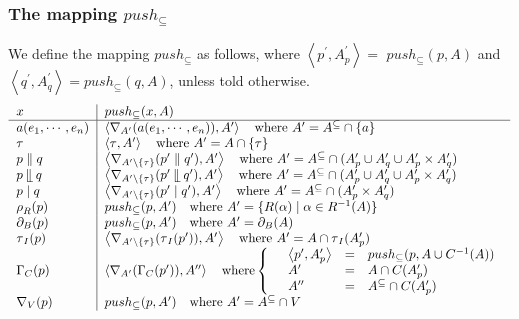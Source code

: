 \documentclass{article}
\begin{document}
\newpage

\subsubsection{The mapping $push_{\subseteq }$}

We define the mapping $push_{\subseteq }$ as follows, where $\left\langle
p^{\prime },A_{p}^{\prime }\right\rangle =$ $push_{\subseteq }(p,A)$ and $%
\left\langle q^{\prime },A_{q}^{\prime }\right\rangle =push_{\subseteq
}(q,A) $, unless told otherwise.%
\[
\begin{tabular}{l|l}
$x$ & $push_{\subseteq }(x,A)$ \\ \hline
$a(e_{1},\cdots ,e_{n})$ & $\left\langle \nabla _{A^{\prime
}}(a(e_{1},\cdots ,e_{n})),A^{\prime }\right\rangle \text{ where }A^{\prime
}=A^{\subseteq }\cap \{a\}$ \\ 
$\tau $ & $\left\langle \tau ,A^{\prime }\right\rangle \text{ where }%
A^{\prime }=A\cap \{\tau \}$ \\ 
$p\parallel q$ & $\left\langle \nabla _{A^{\prime }\setminus \{\tau
\}}(p^{\prime }\parallel q^{\prime }),A^{\prime }\right\rangle \text{ where }%
A^{\prime }=A^{\subseteq }\cap (A_{p}^{\prime }\cup A_{q}^{\prime }\cup
A_{p}^{\prime }\times A_{q}^{\prime })$ \\ 
$p\mathbin{\mathrel{\llfloor}}q$ & $\left\langle \nabla _{A^{\prime
}\setminus \{\tau \}}(p^{\prime }\mathbin{\mathrel{\llfloor}}q^{\prime
}),A^{\prime }\right\rangle \text{ where }A^{\prime }=A^{\subseteq }\cap
(A_{p}^{\prime }\cup A_{q}^{\prime }\cup A_{p}^{\prime }\times A_{q}^{\prime
})$ \\ 
$p\mid q$ & $\left\langle \nabla _{A^{\prime }\setminus \{\tau \}}(p^{\prime
}\mid q^{\prime }),A^{\prime }\right\rangle \text{ where }A^{\prime
}=A^{\subseteq }\cap (A_{p}^{\prime }\times A_{q}^{\prime })$ \\ 
$\rho _{R}(p)$ & $push_{\subseteq }(p,A^{\prime })\text{ where }A^{\prime
}=\{R(\alpha )\mid \alpha \in R^{-1}(A)\}$ \\ 
$\partial _{B}(p)$ & $push_{\subseteq }(p,A^{\prime })\text{ where }%
A^{\prime }=\partial _{B}(A)$ \\ 
$\tau _{I}(p)$ & $\left\langle \nabla _{A^{\prime }\setminus \{\tau \}}(\tau
_{I}(p^{\prime })),A^{\prime }\right\rangle \text{ where }A^{\prime }=A\cap
\tau _{I}(A_{p}^{\prime })\text{ }$ \\ 
$\Gamma _{C}(p)$ & $\left\langle \nabla _{A^{\prime }}(\Gamma _{C}(p^{\prime
})),A^{\prime \prime }\right\rangle \text{ where}\left\{ \text{ }%
\begin{array}{lll}
\left\langle p^{\prime },A_{p}^{\prime }\right\rangle & = & push_{\subseteq
}(p,A\cup C^{-1}(A)) \\ 
A^{\prime } & = & A\cap C(A_{p}^{\prime }) \\ 
A^{\prime \prime } & = & A^{\subseteq }\cap C(A_{p}^{\prime })%
\end{array}%
\right. $ \\ 
$\nabla _{V}(p)$ & $push_{\subseteq }(p,A^{\prime })\text{ where }A^{\prime
}=A^{\subseteq }\cap V$%
\end{tabular}%
\]
\end{document}
